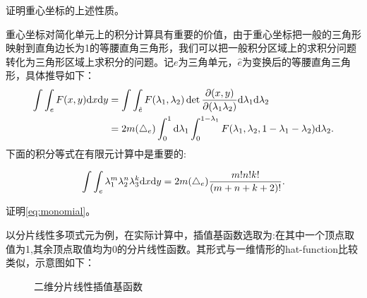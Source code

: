 \begin{exercise}
    证明重心坐标的上述性质。
\end{exercise}
重心坐标对简化单元上的积分计算具有重要的价值，由于重心坐标把一般的三角形映射到直角边长为1的等腰直角三角形，我们可以把一般积分区域上的求积分问题转化为三角形区域上求积分的问题。记$e$为三角单元，$\hat{e}$为变换后的等腰直角三角形，具体推导如下：
\begin{equation}
    \label{eq:changevariables}
    \begin{aligned}
        \int\int_{e}F(x,y)\mathrm{d} x\mathrm{d} y&=\int\int_{\hat{e}}F(\lambda_{1},\lambda_{2})\det\frac{\partial (x,y)}{\partial (\lambda_{1}\lambda_{2})}\mathrm{d}\lambda_{1}\mathrm{d}\lambda_{2}\\
        &=2m(\triangle_{e})\int_{0}^{1}\mathrm{d}\lambda_{1}\int_{0}^{1-\lambda_{1}}F(\lambda_{1},\lambda_{2},1-\lambda_{1}-\lambda_2)\mathrm{d}\lambda_{2}.
    \end{aligned}
\end{equation}
下面的积分等式在有限元计算中是重要的:
\begin{proposition}
    \begin{equation}
        \label{eq:monomial}
        \int\int_{e}\lambda_{1}^{m}\lambda_{2}^{n}\lambda_{3}^{k}\mathrm{d} x\mathrm{d} y=2m(\triangle_{e})\frac{m!n!k!}{(m+n+k+2)!}.
    \end{equation}
\end{proposition}
\begin{exercise}
    证明\eqref{eq:monomial}。
\end{exercise}
以分片线性多项式元为例，在实际计算中，插值基函数选取为:在其中一个顶点取值为1,其余顶点取值均为0的分片线性函数。其形式与一维情形的hat-function比较类似，示意图如下：
\begin{figure}[H]
    \caption{二维分片线性插值基函数}
    \centering
\end{figure}

